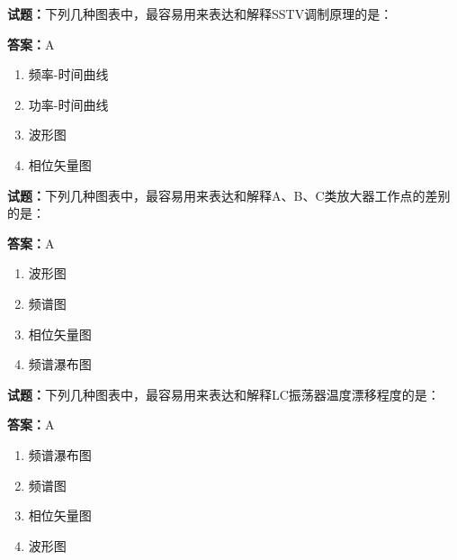 \documentclass{ctexbook}
\begin{document}




\vspace{1em}

\textbf{试题：}下列几种图表中，最容易用来表达和解释SSTV调制原理的是： 

\textbf{答案：}A 

\begin{enumerate}[leftmargin=3em]
  \item 频率-时间曲线 

  \item 功率-时间曲线 

  \item 波形图 

  \item 相位矢量图 

\end{enumerate}





\vspace{1em}

\textbf{试题：}下列几种图表中，最容易用来表达和解释A、B、C类放大器工作点的差别的是： 

\textbf{答案：}A 

\begin{enumerate}[leftmargin=3em]
  \item 波形图 

  \item 频谱图 

  \item 相位矢量图 

  \item 频谱瀑布图 

\end{enumerate}





\vspace{1em}

\textbf{试题：}下列几种图表中，最容易用来表达和解释LC振荡器温度漂移程度的是： 

\textbf{答案：}A 

\begin{enumerate}[leftmargin=3em]
  \item 频谱瀑布图 

  \item 频谱图 


  \item 相位矢量图 

  \item 波形图 

\end{enumerate}
\end{document}
